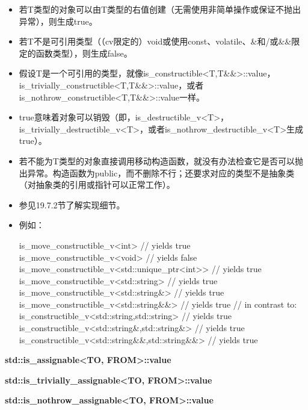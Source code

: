 \begin{itemize}
\item 
若T类型的对象可以由T类型的右值创建（无需使用非简单操作或保证不抛出异常），则生成true。

\item 
若T不是可引用类型（（cv限定的）void或使用const、volatile、\&和/或\&\&限定的函数类型），则生成false。

\item 
假设T是一个可引用的类型，就像is\_constructible<T,T\&\&>::value，is\_trivially\_constructible<T,T\&\&>::value，或者is\_nothrow\_constructible<T,T\&\&>::value一样。

\item 
true意味着对象可以销毁（即，is\_destructible\_v<T>，is\_trivially\_destructible\_v<T>，或者is\_nothrow\_destructible\_v<T>生成true）。

\item 
若不能为T类型的对象直接调用移动构造函数，就没有办法检查它是否可以抛出异常。构造函数为public，而不删除不行；还要求对应的类型不是抽象类（对抽象类的引用或指针可以正常工作）。

\item 
参见19.7.2节了解实现细节。

\item 
例如：
\begin{cpp}
is_move_constructible_v<int> // yields true
is_move_constructible_v<void> // yields false
is_move_constructible_v<std::unique_ptr<int>> // yields true
is_move_constructible_v<std::string> // yields true
is_move_constructible_v<std::string&> // yields true
is_move_constructible_v<std::string&&> // yields true
// in contrast to:
is_constructible_v<std::string,std::string> // yields true
is_constructible_v<std::string&,std::string&> // yields true
is_constructible_v<std::string&&,std::string&&> // yields true
\end{cpp}
\end{itemize}

\textbf{std::is\_assignable<TO, FROM>::value}

\textbf{std::is\_trivially\_assignable<TO, FROM>::value}

\textbf{std::is\_nothrow\_assignable<TO, FROM>::value}

